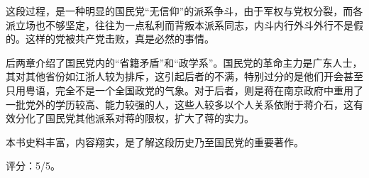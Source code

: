 这段过程，是一种明显的国民党“无信仰”的派系争斗，由于军权与党权分裂，而各派立场也不够坚定，往往为一点私利而背叛本派系同志，内斗内行外斗外行不是假的。这样的党被共产党击败，真是必然的事情。

后两章介绍了国民党内的“省籍矛盾”和“政学系”。国民党的革命主力是广东人士，其对其他省份如江浙人较为排斥，这引起后者的不满，特别过分的是他们开会甚至只用粤语，完全不是一个全国政党的气象。对于后者，则是蒋在南京政府中重用了一批党外的学历较高、能力较强的人，这些人较多以个人关系依附于蒋介石，这有效分化了国民党其他派系对蒋的限权，扩大了蒋的实力。

本书史料丰富，内容翔实，是了解这段历史乃至国民党的重要著作。

评分：5/5。